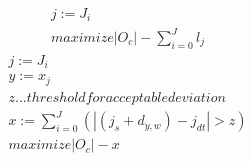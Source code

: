 \documentclass[a4paper,12pt,twoside]{scrreprt}
\begin{document}
\begin{flushleft}
\begin{equation}
	\label{objective_function_5}
	\begin{split}
		j := J_{i} \\
		maximize |O_{c}| - \sum_{i=0}^{J}l_{j}
	\end{split}
	\end{equation}
	\begin{equation}
	\label{objective_function_6}
	\begin{split}
		j := J_{i} \\
		y := x_{j} \\
		z ... threshold for acceptable deviation \\
		x := \sum_{i=0}^{J} (|(j_{s} + d_{y,w}) - j_{dt}| > z)\\
		maximize |O_{c}| - x
	\end{split}
	\end{equation}
\end{flushleft}
\end{document}
